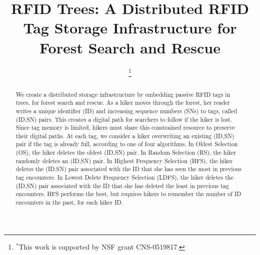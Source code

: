 \documentclass[conference]{IEEEtran}
\begin{document}
\title{RFID Trees: A Distributed RFID Tag Storage Infrastructure for Forest Search and Rescue}

\author{
\thanks{$^*$This work is supported by NSF grant  CNS-0519817.}
}

\maketitle

\begin{abstract}
We create a distributed storage infrastructure by embedding passive RFID tags in trees, for forest search and rescue.  As a hiker moves through the forest, her reader writes a unique identifier (ID) and increasing sequence numbers (SNs) to tags, called (ID,SN) pairs.  This creates a digital path for searchers to follow if the hiker is lost.  Since tag memory is limited, hikers must share this constrained resource to preserve their digital paths.  At each tag, we consider a hiker overwriting an existing (ID,SN) pair if the tag is already full, according to one of four algorithms.  In Oldest Selection (OS), the hiker deletes the oldest (ID,SN) pair.  In Random Selection (RS), the hiker randomly deletes an (ID,SN) pair.  In Highest Frequency Selection (HFS), the hiker deletes the (ID,SN) pair associated with the ID that she has seen the most in previous tag encounters.  In Lowest Delete Frequency Selection (LDFS), the hiker deletes the (ID,SN) pair associated with the ID that she has deleted the least in previous tag encounters.   HFS performs the best, but requires hikers to remember the number of ID encounters in the past, for each hiker ID.
\end{abstract}
\end{document}
